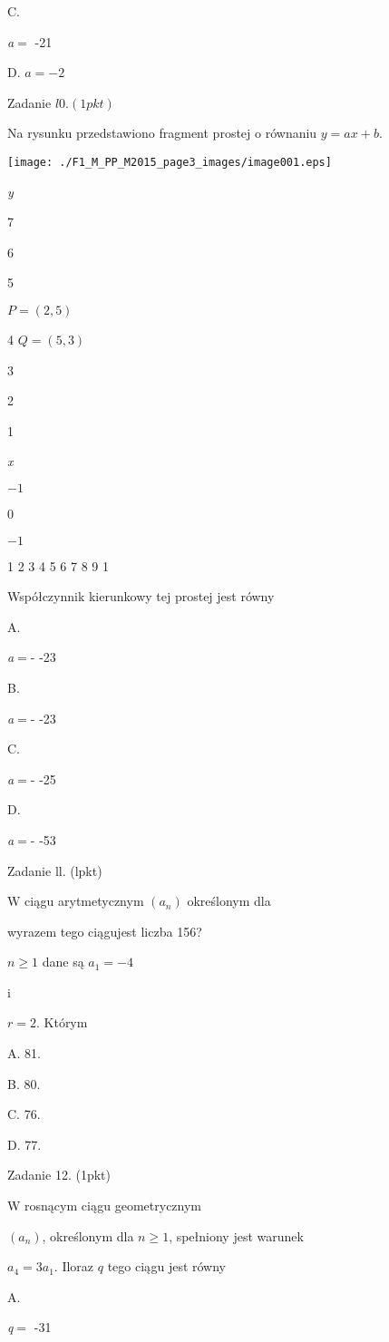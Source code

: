\documentclass[a4paper,12pt]{article}
\begin{document}
C.

{\it a}$=$ -21

D. $a=-2$

Zadanie $l0. (1pkt)$

Na rysunku przedstawiono fragment prostej o równaniu $y=ax+b.$
\begin{center}
\texttt{[image: ./F1\_M\_PP\_M2015\_page3\_images/image001.eps]}
\end{center}
{\it y}

7

6

5

$P=(2,5)$

4  $Q=(5,3)$

3

2

1

{\it x}

$-1$

0

$-1$

1 2 3 4  5 6 7 8  9 1

Współczynnik kierunkowy tej prostej jest równy

A.

{\it a}$=$- -23

B.

{\it a}$=$- -23

C.

{\it a}$=$- -25

D.

{\it a}$=$- -53

Zadanie ll. (lpkt)

$\mathrm{W}$ ciągu arytmetycznym $(a_{n})$ określonym dla

wyrazem tego ciągujest liczba 156?

$n\geq 1$ dane są $a_{1}=-4$

i

$r=2$. Którym

A. 81.

B. 80.

C. 76.

D. 77.

Zadanie 12. (1pkt)

W rosnącym ciągu geometrycznym

$(a_{n})$, określonym dla $n\geq 1$, spełniony jest warunek

$a_{4}=3a_{1}$. Iloraz $q$ tego ciągu jest równy

A.

{\it q}$=$ -31
\end{document}
